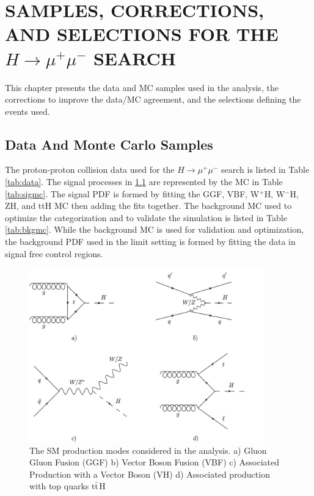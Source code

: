 \chapter{SAMPLES, CORRECTIONS, AND SELECTIONS FOR THE $H\rightarrow\mu^+\mu^-$ SEARCH} \label{samples}

This chapter presents the data and MC samples used in the analysis, the corrections to improve the data/MC agreement, and the selections defining the events used.

\section{Data And Monte Carlo Samples} \label{sampsec}

The proton-proton collision data used for the $H\rightarrow\mu^+\mu^-$ search is listed in Table \ref{tab:data}. The signal processes in \ref{fig:hfeynprod2} are represented by the MC in Table \ref{tab:sigmc}. The signal PDF is formed by fitting the GGF, VBF, W$^+$H, W$^-$H, ZH, and ttH MC then adding the fits together. The background MC used to optimize the categorization and to validate the simulation is listed in Table \ref{tab:bkgmc}. While the background MC is used for validation and optimization, the background PDF used in the limit setting is formed by fitting the data in signal free control regions. 

\begin{figure}[h!]
  \centering
  \includegraphics[width=4in]{images/higgs_production_modes.png}
  \caption[Standard Model Higgs boson production modes.]
   {The SM production modes considered in the analysis. a) Gluon Gluon Fusion (GGF) b) Vector Boson Fusion (VBF) c) Associated Production with a Vector Boson (VH) d) Associated production with top quarks ${\rm t\bar{t}}$H}
  \label{fig:hfeynprod2}
\end{figure}

